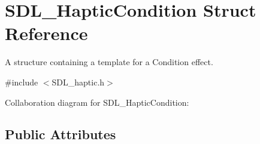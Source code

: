 \hypertarget{struct_s_d_l___haptic_condition}{\section{S\-D\-L\-\_\-\-Haptic\-Condition Struct Reference}
\label{struct_s_d_l___haptic_condition}
}


A structure containing a template for a Condition effect.  




{\ttfamily \#include $<$S\-D\-L\-\_\-haptic.\-h$>$}



Collaboration diagram for S\-D\-L\-\_\-\-Haptic\-Condition\-:
\subsection*{Public Attributes}
